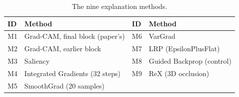 \documentclass[11pt]{article}
\begin{document}
\begin{table}[H]
\centering
\caption{The nine explanation methods.}
\label{tab:methods}
\begin{tabular}{llll}
\toprule
ID & Method & ID & Method \\
\midrule
M1 & Grad-CAM, final block (paper's) & M6 & VarGrad \\
M2 & Grad-CAM, earlier block & M7 & LRP (EpsilonPlusFlat) \\
M3 & Saliency & M8 & Guided Backprop (control) \\
M4 & Integrated Gradients (32 steps) & M9 & ReX (3D occlusion) \\
M5 & SmoothGrad (20 samples) & & \\
\bottomrule
\end{tabular}
\end{table}
\end{document}
